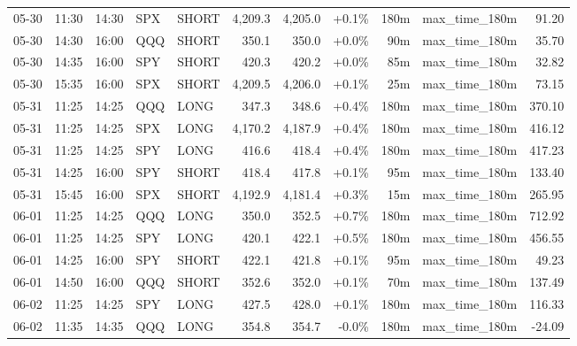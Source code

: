 \documentclass[11pt,a4paper,twoside]{article}
\begin{document}
\begin{center}
\begin{longtable}{>{\color{txtmain}}l l l l l r r r r >{\color{txtmain}}l r}
05-30 & 11:30 & 14:30 & SPX & SHORT & 4,209.3 & 4,205.0 & \textcolor{wingreen}{+0.1\%} & 180m & max\_time\_180m & \textcolor{wingreen}{91.20} \\
05-30 & 14:30 & 16:00 & QQQ & SHORT & 350.1 & 350.0 & \textcolor{wingreen}{+0.0\%} & 90m & max\_time\_180m & \textcolor{wingreen}{35.70} \\
05-30 & 14:35 & 16:00 & SPY & SHORT & 420.3 & 420.2 & \textcolor{wingreen}{+0.0\%} & 85m & max\_time\_180m & \textcolor{wingreen}{32.82} \\
05-30 & 15:35 & 16:00 & SPX & SHORT & 4,209.5 & 4,206.0 & \textcolor{wingreen}{+0.1\%} & 25m & max\_time\_180m & \textcolor{wingreen}{73.15} \\
05-31 & 11:25 & 14:25 & QQQ & LONG & 347.3 & 348.6 & \textcolor{wingreen}{+0.4\%} & 180m & max\_time\_180m & \textcolor{wingreen}{370.10} \\
05-31 & 11:25 & 14:25 & SPX & LONG & 4,170.2 & 4,187.9 & \textcolor{wingreen}{+0.4\%} & 180m & max\_time\_180m & \textcolor{wingreen}{416.12} \\
05-31 & 11:25 & 14:25 & SPY & LONG & 416.6 & 418.4 & \textcolor{wingreen}{+0.4\%} & 180m & max\_time\_180m & \textcolor{wingreen}{417.23} \\
05-31 & 14:25 & 16:00 & SPY & SHORT & 418.4 & 417.8 & \textcolor{wingreen}{+0.1\%} & 95m & max\_time\_180m & \textcolor{wingreen}{133.40} \\
05-31 & 15:45 & 16:00 & SPX & SHORT & 4,192.9 & 4,181.4 & \textcolor{wingreen}{+0.3\%} & 15m & max\_time\_180m & \textcolor{wingreen}{265.95} \\
06-01 & 11:25 & 14:25 & QQQ & LONG & 350.0 & 352.5 & \textcolor{wingreen}{+0.7\%} & 180m & max\_time\_180m & \textcolor{wingreen}{712.92} \\
06-01 & 11:25 & 14:25 & SPY & LONG & 420.1 & 422.1 & \textcolor{wingreen}{+0.5\%} & 180m & max\_time\_180m & \textcolor{wingreen}{456.55} \\
06-01 & 14:25 & 16:00 & SPY & SHORT & 422.1 & 421.8 & \textcolor{wingreen}{+0.1\%} & 95m & max\_time\_180m & \textcolor{wingreen}{49.23} \\
06-01 & 14:50 & 16:00 & QQQ & SHORT & 352.6 & 352.0 & \textcolor{wingreen}{+0.1\%} & 70m & max\_time\_180m & \textcolor{wingreen}{137.49} \\
06-02 & 11:25 & 14:25 & SPY & LONG & 427.5 & 428.0 & \textcolor{wingreen}{+0.1\%} & 180m & max\_time\_180m & \textcolor{wingreen}{116.33} \\
06-02 & 11:35 & 14:35 & QQQ & LONG & 354.8 & 354.7 & \textcolor{lossred}{-0.0\%} & 180m & max\_time\_180m & \textcolor{lossred}{-24.09} \\

\end{longtable}
\end{center}
\end{document}

